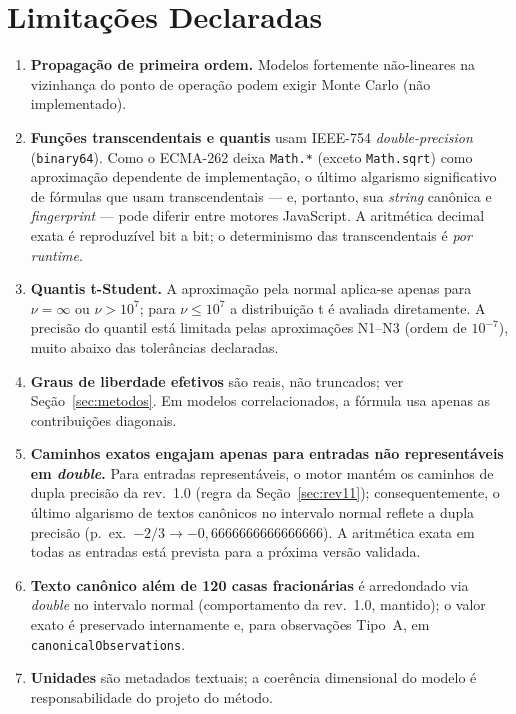 \documentclass[11pt,a4paper]{article}
\begin{document}
\section{Limitações Declaradas}
\label{sec:limitacoes}

\begin{enumerate}
  \item \textbf{Propagação de primeira ordem.} Modelos fortemente não-lineares na vizinhança do ponto de operação podem exigir Monte Carlo (não implementado).
  \item \textbf{Funções transcendentais e quantis} usam IEEE-754 \emph{double-precision} (\texttt{binary64}). Como o ECMA-262 deixa \texttt{Math.*} (exceto \texttt{Math.sqrt}) como aproximação dependente de implementação, o último algarismo significativo de fórmulas que usam transcendentais --- e, portanto, sua \emph{string} canônica e \emph{fingerprint} --- pode diferir entre motores JavaScript. A aritmética decimal exata é reproduzível bit a bit; o determinismo das transcendentais é \emph{por runtime}.
  \item \textbf{Quantis t-Student.} A aproximação pela normal aplica-se apenas para \(\nu = \infty\) ou \(\nu > 10^{7}\); para \(\nu \leq 10^{7}\) a distribuição t é avaliada diretamente. A precisão do quantil está limitada pelas aproximações N1--N3 (ordem de \(10^{-7}\)), muito abaixo das tolerâncias declaradas.
  \item \textbf{Graus de liberdade efetivos} são reais, não truncados; ver Seção~\ref{sec:metodos}. Em modelos correlacionados, a fórmula usa apenas as contribuições diagonais.
  \item \textbf{Caminhos exatos engajam apenas para entradas não representáveis em \emph{double}.} Para entradas representáveis, o motor mantém os caminhos de dupla precisão da rev.\ 1.0 (regra da Seção~\ref{sec:rev11}); consequentemente, o último algarismo de textos canônicos no intervalo normal reflete a dupla precisão (p.~ex.\ \(-2/3 \to -0{,}6666666666666666\)). A aritmética exata em todas as entradas está prevista para a próxima versão validada.
  \item \textbf{Texto canônico além de 120 casas fracionárias} é arredondado via \emph{double} no intervalo normal (comportamento da rev.\ 1.0, mantido); o valor exato é preservado internamente e, para observações Tipo~A, em \texttt{canonicalObservations}.
  \item \textbf{Unidades} são metadados textuais; a coerência dimensional do modelo é responsabilidade do projeto do método.
\end{enumerate}
\end{document}
